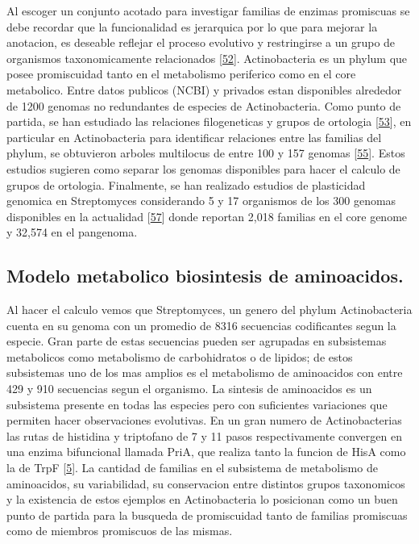\documentclass[12pt,twoside]{reedthesis}
\begin{document}
  Al escoger un conjunto acotado para investigar familias de enzimas
  promiscuas se debe recordar que la funcionalidad es jerarquica por lo
  que para mejorar la anotacion, es deseable reflejar el proceso evolutivo
  y restringirse a un grupo de organismos taxonomicamente relacionados
  {[}\protect\hyperlink{ref-cruz-morales_phylogenomic_2016}{52}{]}.
  Actinobacteria es un phylum que posee promiscuidad tanto en el
  metabolismo periferico como en el core metabolico. Entre datos publicos
  (NCBI) y privados estan disponibles alrededor de 1200 genomas no
  redundantes de especies de Actinobacteria. Como punto de partida, se han
  estudiado las relaciones filogeneticas y grupos de ortologia
  {[}\protect\hyperlink{ref-li_orthomcl_2003}{53}{]}, en particular en
  Actinobacteria para identificar relaciones entre las familias del
  phylum, se obtuvieron arboles multilocus de entre 100 y 157 genomas
  {[}\protect\hyperlink{ref-gao_phylogenetic_2012}{55}{]}. Estos estudios
  sugieren como separar los genomas disponibles para hacer el calculo de
  grupos de ortologia. Finalmente, se han realizado estudios de
  plasticidad genomica en Streptomyces considerando 5 y 17 organismos de
  los 300 genomas disponibles en la actualidad
  {[}\protect\hyperlink{ref-zhou_genome_2012}{57}{]} donde reportan 2,018
  familias en el core genome y 32,574 en el pangenoma.
  
  \subsection{Modelo metabolico biosintesis de
  aminoacidos.}\label{modelo-metabolico-biosintesis-de-aminoacidos.}
  
  Al hacer el calculo vemos que Streptomyces, un genero del phylum
  Actinobacteria cuenta en su genoma con un promedio de 8316 secuencias
  codificantes segun la especie. Gran parte de estas secuencias pueden ser
  agrupadas en subsistemas metabolicos como metabolismo de carbohidratos o
  de lipidos; de estos subsistemas uno de los mas amplios es el
  metabolismo de aminoacidos con entre 429 y 910 secuencias segun el
  organismo. La sintesis de aminoacidos es un subsistema presente en todas
  las especies pero con suficientes variaciones que permiten hacer
  observaciones evolutivas. En un gran numero de Actinobacterias las rutas
  de histidina y triptofano de 7 y 11 pasos respectivamente convergen en
  una enzima bifuncional llamada PriA, que realiza tanto la funcion de
  HisA como la de TrpF
  {[}\protect\hyperlink{ref-baronagomez_occurrence_2003}{5}{]}. La
  cantidad de familias en el subsistema de metabolismo de aminoacidos, su
  variabilidad, su conservacion entre distintos grupos taxonomicos y la
  existencia de estos ejemplos en Actinobacteria lo posicionan como un
  buen punto de partida para la busqueda de promiscuidad tanto de familias
  promiscuas como de miembros promiscuos de las mismas.
  
\end{document}

